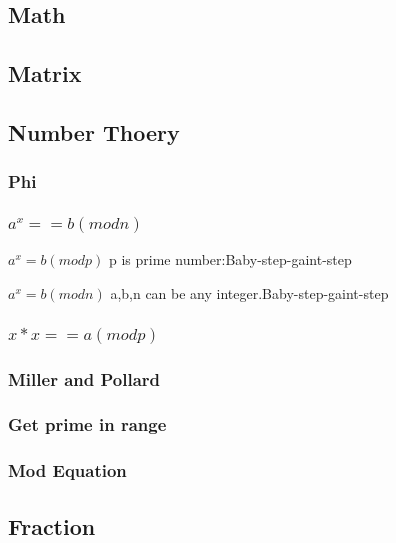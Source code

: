 \documentclass[a4paper,5pt,twocolumn,titlepage]{article}
\begin{document}
\begin{CJK*}{GBK}{song}
\section{Math}
    \subsection{Matrix}
        
    \subsection{Number Thoery}
        \subsubsection{Phi}
             
        \subsubsection{$a^x == b(mod n)$}
            $a^x=b(mod p)$ p is prime number:Baby-step-gaint-step
            
            $a^x=b(mod n)$ a,b,n can be any integer.Baby-step-gaint-step
            
        \subsubsection{$x*x == a (mod p)$}
            
        \subsubsection{Miller and Pollard}
            
        \subsubsection{Get prime in range}
            
        \subsubsection{Mod Equation}
             
    \subsection{Fraction}

\end{CJK*}
\end{document}
